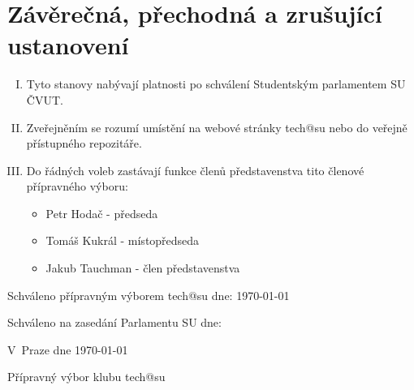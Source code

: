 \documentclass[10pt]{article}
\begin{document}
\section{Závěrečná, přechodná a zrušující ustanovení}
	\begin{enumerate}[I.]
	\item Tyto stanovy nabývají platnosti po schválení Studentským parlamentem SU ČVUT.
	\item Zveřejněním se rozumí umístění na webové stránky tech@su nebo do veřejně přístupného repozitáře.
	\item Do řádných voleb zastávají funkce členů představenstva tito členové přípravného výboru:
		\begin{itemize}
			\item Petr Hodač - předseda
			\item Tomáš Kukrál - místopředseda
			\item Jakub Tauchman - člen představenstva
		\end{itemize}
	\end{enumerate}


\vspace{10mm}

Schváleno přípravným výborem tech@su dne: \today

Schváleno na zasedání Parlamentu SU dne:

\vspace{30mm}

\hfill V~Praze dne \today

\hfill Přípravný výbor klubu tech@su
\end{document}
